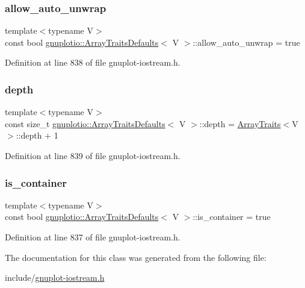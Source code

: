 \subsubsection{\texorpdfstring{allow\+\_\+auto\+\_\+unwrap}{allow\_auto\_unwrap}}
{\footnotesize\ttfamily template$<$typename V$>$ \\
const bool \hyperlink{classgnuplotio_1_1_array_traits_defaults}{gnuplotio\+::\+Array\+Traits\+Defaults}$<$ V $>$\+::allow\+\_\+auto\+\_\+unwrap = true\hspace{0.3cm}{\ttfamily [static]}}



Definition at line 838 of file gnuplot-\/iostream.\+h.

\mbox{\label{classgnuplotio_1_1_array_traits_defaults_ac51367f5da9096249b162af1496e36ab}} 
\subsubsection{\texorpdfstring{depth}{depth}}
{\footnotesize\ttfamily template$<$typename V$>$ \\
const size\+\_\+t \hyperlink{classgnuplotio_1_1_array_traits_defaults}{gnuplotio\+::\+Array\+Traits\+Defaults}$<$ V $>$\+::depth = \hyperlink{classgnuplotio_1_1_array_traits}{Array\+Traits}$<$V$>$\+::depth + 1\hspace{0.3cm}{\ttfamily [static]}}



Definition at line 839 of file gnuplot-\/iostream.\+h.

\mbox{\label{classgnuplotio_1_1_array_traits_defaults_a57bab5bf3617f0ee66fdd4dcb751aa21}} 
\subsubsection{\texorpdfstring{is\+\_\+container}{is\_container}}
{\footnotesize\ttfamily template$<$typename V$>$ \\
const bool \hyperlink{classgnuplotio_1_1_array_traits_defaults}{gnuplotio\+::\+Array\+Traits\+Defaults}$<$ V $>$\+::is\+\_\+container = true\hspace{0.3cm}{\ttfamily [static]}}



Definition at line 837 of file gnuplot-\/iostream.\+h.



The documentation for this class was generated from the following file\+:\begin{DoxyCompactItemize}
\item 
include/\hyperlink{gnuplot-iostream_8h}{gnuplot-\/iostream.\+h}\end{DoxyCompactItemize}
